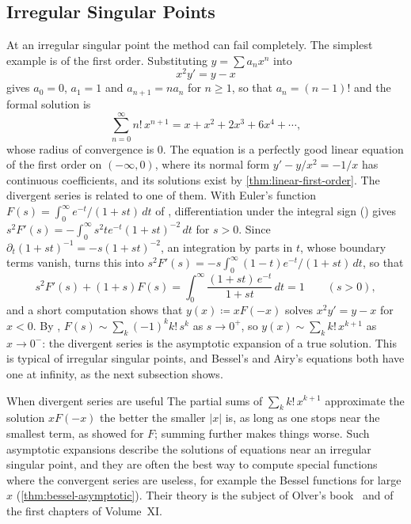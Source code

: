 \subsection{Irregular Singular Points}

At an irregular singular point the method can fail completely. The simplest example is of the first order. Substituting $y=\sum a_nx^n$ into
\[
x^2y'=y-x
\]
gives $a_0=0$, $a_1=1$ and $a_{n+1}=na_n$ for $n\ge1$, so that $a_n=(n-1)!$ and the formal solution is
\[
\sum_{n=0}^\infty n!\,x^{n+1}=x+x^2+2x^3+6x^4+\cdots ,
\]
whose radius of convergence is $0$. The equation is a perfectly good linear equation of the first order on $(-\infty,0)$, where its normal form $y'-y/x^2=-1/x$ has continuous coefficients, and its solutions exist by \cref{thm:linear-first-order}. The divergent series is related to one of them. With Euler's function $F(s)=\int_0^\infty e^{-t}/(1+st)\,dt$ of , differentiation under the integral sign () gives $s^2F'(s)=-\int_0^\infty s^2te^{-t}(1+st)^{-2}\,dt$ for $s>0$. Since $\partial_t(1+st)^{-1}=-s(1+st)^{-2}$, an integration by parts in $t$, whose boundary terms vanish, turns this into $s^2F'(s)=-s\int_0^\infty(1-t)e^{-t}/(1+st)\,dt$, so that
\[
s^2F'(s)+(1+s)F(s)=\int_0^\infty\frac{(1+st)\,e^{-t}}{1+st}\,dt=1\qquad(s>0),
\]
and a short computation shows that $y(x)\coloneqq xF(-x)$ solves $x^2y'=y-x$ for $x<0$. By , $F(s)\sim\sum_k(-1)^kk!\,s^k$ as $s\to0^+$, so $y(x)\sim\sum_kk!\,x^{k+1}$ as $x\to0^-$: the divergent series is the asymptotic expansion of a true solution. This is typical of irregular singular points, and Bessel's and Airy's equations both have one at infinity, as the next subsection shows.

\begin{note}{When divergent series are useful}
The partial sums of $\sum_kk!\,x^{k+1}$ approximate the solution $xF(-x)$ the better the smaller $|x|$ is, as long as one stops near the smallest term, as  showed for $F$; summing further makes things worse. Such asymptotic expansions describe the solutions of equations near an irregular singular point, and they are often the best way to compute special functions where the convergent series are useless, for example the Bessel functions for large $x$ (\cref{thm:bessel-asymptotic}). Their theory is the subject of Olver's book~\cite{olver1997asymptotics} and of the first chapters of Volume~XI.
\end{note}

